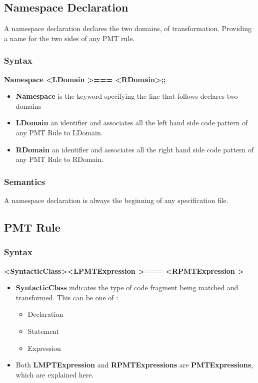 \documentclass[preprint]{sigplanconf}
\begin{document}
\subsection{Namespace Declaration}

A namespace declaration declares the two domains, of transformation. Providing a name for the two sides of any PMT rule.

\subsubsection{Syntax}

\textbf{Namespace  \textless LDomain \textgreater  === \textless RDomain\textgreater;;}
\begin{itemize}
\item \textbf{Namespace} is the keyword specifying the line that follows declares two domains
\item \textbf{LDomain} an identifier and associates all the left hand side code pattern of any PMT Rule  to LDomain.
\item \textbf{RDomain} an identifier and associates all the right hand side code pattern of any PMT Rule  to RDomain.

\end{itemize}

\subsubsection{Semantics}

A namespace declaration is always the beginning of any specification file.

\subsection{PMT Rule}

\subsubsection{Syntax}
\textbf{\textless SyntacticClass\textgreater \textless LPMTExpression \textgreater === \textless RPMTExpression \textgreater}

\begin{itemize}
\item \textbf{SyntacticClass} indicates the type of code fragment being matched and transformed. This can be one of :
\begin{itemize}
\item Declaration
\item Statement
\item Expression
\end{itemize}
\item Both \textbf{LMPTExpression} and \textbf{RPMTExpressions} are \textbf{PMTExpressions}, which are explained here.
\end{itemize}
\end{document}
